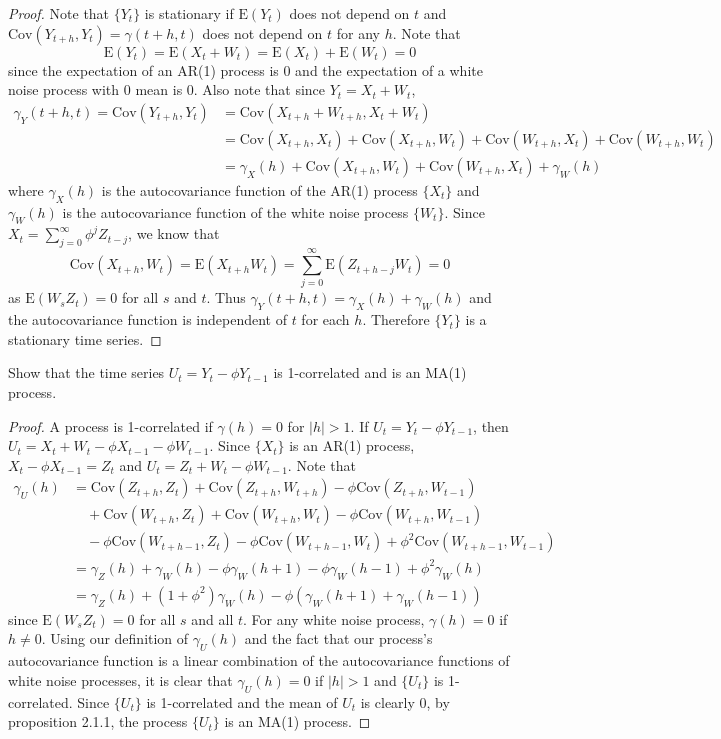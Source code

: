 \documentclass[12pt]{article}
\theoremstyle{definition}
\newenvironment{custompbm}[1]
  {\renewcommand\theproblem{#1}\problem}
  {\endproblem}
\newcommand{\E}{\text{E}}
\newcommand{\Co}[2]{\text{Cov}\left({#1}, {#2}\right)}
\begin{document}
\begin{proof}
  Note that $\{Y_t\}$ is stationary if $\E(Y_t)$ does not depend on $t$ and
  $\Co{Y_{t+h}}{Y_t} = \gamma(t+h,t)$ does not depend on $t$ for any $h$. Note that
  \[
    \E(Y_t) = \E(X_t + W_t) = \E(X_t) + \E(W_t) = 0
  \]
  since the expectation of an AR(1) process is 0 and the expectation of a white
  noise process with 0 mean is 0. Also note that since $Y_t = X_t + W_t$,
  \begin{align*}
    \gamma_Y(t+h,t) = \Co{Y_{t+h}}{Y_t} &= \Co{X_{t+h} + W_{t+h}}{X_t + W_t}\\
    &= \Co{X_{t+h}}{X_t} + \Co{X_{t+h}}{W_t} + \Co{W_{t+h}}{X_t} + \Co{W_{t+h}}{W_t}\\
    &= \gamma_X(h) + \Co{X_{t+h}}{W_t} + \Co{W_{t+h}}{X_t} + \gamma_W(h)
  \end{align*}
  where $\gamma_X(h)$ is the autocovariance function of the AR(1) process $\{X_t\}$
  and $\gamma_W(h)$ is the autocovariance function of the white noise process $\{W_t\}$.
  Since $X_t = \sum_{j=0}^{\infty}\phi^{j}Z_{t-j}$, we know that
  \[
    \Co{X_{t+h}}{W_t} = \E(X_{t+h}W_t) = \sum_{j=0}^\infty\E(Z_{t+h-j}W_t) = 0
  \]
  as $\E(W_sZ_t) = 0$ for all $s$ and $t$. Thus $\gamma_Y(t+h,t) = \gamma_X(h) + \gamma_W(h)$
  and the autocovariance function is independent of $t$ for each $h$. Therefore
  $\{Y_t\}$ is a stationary time series.
\end{proof}


\begin{custompbm}{3.b}
  Show that the time series $U_t = Y_t - \phi Y_{t-1}$ is 1-correlated and is an MA(1) process.
\end{custompbm}

\begin{proof}
  A process is 1-correlated if $\gamma(h) = 0$ for $|h| > 1$.
  If $U_t = Y_t - \phi Y_{t-1}$, then $U_t = X_t + W_t - \phi X_{t-1} - \phi W_{t-1}$.
  Since $\{X_t\}$ is an AR(1) process, $X_t - \phi X_{t-1} = Z_t$ and
  $U_t = Z_t + W_t - \phi W_{t-1}$. Note that
  \begin{align*}
    \gamma_U(h) &= \Co{Z_{t+h}}{Z_t} + \Co{Z_{t+h}}{W_{t+h}} -\phi \Co{Z_{t+h}}{W_{t-1}}\\
    &\quad + \Co{W_{t+h}}{Z_t} + \Co{W_{t+h}}{W_t} - \phi \Co{W_{t+h}}{W_{t-1}} \\
    &\quad -\phi \Co{W_{t+h-1}}{Z_t} -\phi\Co{W_{t+h-1}}{W_t} + \phi^2 \Co{W_{t+h-1}}{W_{t-1}}\\
    &= \gamma_Z(h) + \gamma_W(h) -\phi\gamma_W(h+1) -\phi\gamma_W(h-1) + \phi^2 \gamma_W(h)\\
    &= \gamma_Z(h) + (1 + \phi^2)\gamma_W(h) - \phi(\gamma_W(h+1) + \gamma_W(h-1))
  \end{align*}
  since $\E(W_sZ_t) = 0$ for all $s$ and all $t$. For any white noise process,
  $\gamma(h) = 0$ if $h \neq 0$. Using our definition of $\gamma_U(h)$ and the fact
  that our process's autocovariance function is a linear combination of the
  autocovariance functions of white noise processes, it is clear that $\gamma_U(h) = 0$ if $|h| > 1$
  and $\{U_t\}$ is 1-correlated. Since $\{U_t\}$ is 1-correlated and the mean of
  $U_t$ is clearly 0, by proposition 2.1.1, the process $\{U_t\}$ is an MA(1)
  process.
\end{proof}
\end{document}
